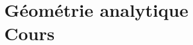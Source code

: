 \ifpdf\makeatletter\@twosidefalse\makeatother\fi
\part[Cours]{G\'{e}om\'{e}trie analytique\\ Cours\protect\thispagestyle{ctu}}
\ifpdf\makeatletter\@twosidetrue\makeatother\fi
\cleardoublepage
\renewcommand{\thechapter}{\arabic{chapter}}
\renewcommand{\chaptername}{Chapitre}
\renewcommand{\thesection}{\thechapter.\arabic{section}}
\cleardoublepage
\endinput

